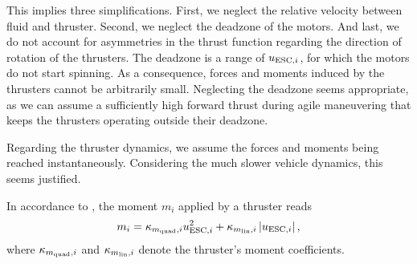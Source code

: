 This implies three simplifications.
First, we neglect the relative velocity between fluid and thruster.
Second, we neglect the deadzone of the motors.
And last, we do not account for asymmetries in the thrust function regarding the direction of rotation of the thrusters.
The deadzone is a range of $u_{\text{ESC},i}$, for which the motors do not start spinning.
As a consequence, forces and moments induced by the thrusters cannot be arbitrarily small.
Neglecting the deadzone seems appropriate, as we can assume a sufficiently high forward thrust during agile maneuvering that keeps the thrusters operating outside their deadzone.

Regarding the thruster dynamics, we assume the forces and moments being reached instantaneously. Considering the much slower vehicle dynamics, this seems justified.

In accordance to , the moment $m_i$ applied by a thruster reads
\begin{equation}
	\label{eq:moment-function}
	m_i = \kappa_{m_{\text{quad}}, i} u_{\text{ESC},i}^2
	+ \kappa_{m_{\text{lin}}, i} \left\lvert u_{\text{ESC},i} \right\rvert
	,
\end{equation}
where $\kappa_{m_{\text{quad}}, i}$ and $\kappa_{m_{\text{lin}}, i}$ denote the thruster's moment coefficients.

